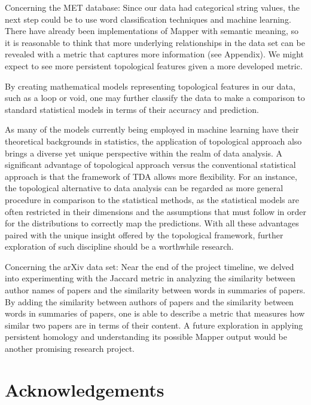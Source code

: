 \documentclass[12pt]{article}
\theoremstyle{definition}
\begin{document}
\par Concerning the MET database: Since our data had categorical string values, the next step could be to use word classification techniques and machine learning. There have already been implementations of Mapper with semantic meaning, so it is reasonable to think that more underlying relationships in the data set can be revealed with a metric that captures more information (see Appendix). We might expect to see more persistent topological features given a more developed metric.
\newline
\par By creating mathematical models representing topological features in our data, such as a loop or void, one may further classify the data to make a comparison to standard statistical models in terms of their accuracy and prediction.
\newline 
\par As many of the models currently being employed in machine learning have their theoretical backgrounds in statistics, the application of topological approach also brings a diverse yet unique perspective within the realm of data analysis. A  significant advantage of topological approach versus the conventional statistical approach is that the framework of TDA allows more flexibility. For an instance, the topological alternative to data analysis can be regarded as more general procedure in comparison to the statistical methods, as the statistical models are often restricted in their dimensions and the assumptions that must follow in order for the distributions to correctly map the predictions. With all these advantages paired with the unique insight offered by the topological framework, further exploration of such discipline should be a worthwhile research. 
\newline
\par Concerning the arXiv data set: Near the end of the project timeline, we delved into experimenting with the Jaccard metric in analyzing the similarity between author names of papers and the similarity between words in summaries of papers. By adding the similarity between authors of papers and the similarity between words in summaries of papers, one is able to describe a metric that measures how similar two papers are in terms of their content. A future exploration in applying persistent homology and understanding its possible Mapper output would be another promising research project. 

\section{Acknowledgements}
\end{document}
